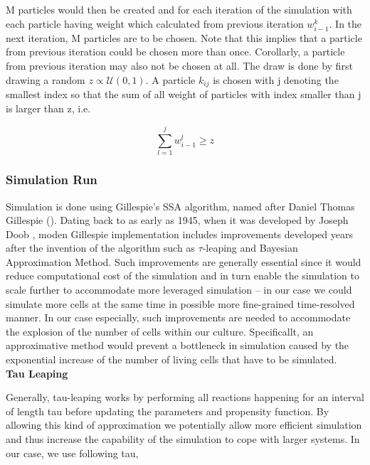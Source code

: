 \documentclass{bioinfo}
\begin{document}
M particles would then be created and for each iteration of the simulation with each particle having weight which calculated from previous iteration $w_{i - 1}^k$. In the next iteration, M particles are to be chosen. Note that this implies that a particle from previous iteration could be chosen more than once. Corollarly, a particle from previous iteration may also not be chosen at all. The draw is done by first drawing a random $z \propto \mathcal{U}(0, 1)$. A particle $k_{ij}$ is chosen with j denoting the smallest index so that the sum of all weight of particles with index smaller than j is larger than z, i.e.

\begin{equation}
\sum_{l=1}^{j} w_{i - 1}^l \geq z\label{eq:14}
\end{equation}

\subsubsection{Simulation Run}

Simulation is done using Gillespie's SSA algorithm, named after Daniel Thomas Gillespie (\citealp{Gillespie77}). Dating back to as early as 1945, when it was developed by Joseph Doob \citealp{Doob45} \citealp{Chung67}, moden Gillespie implementation includes improvements developed years after the invention of the algorithm such as $\tau$-leaping and Bayesian Approximation Method. Such improvements are generally essential since it would reduce computational cost of the simulation and in turn enable the simulation to scale further to accommodate more leveraged simulation -- in our case we could simulate more cells at the same time in possible more fine-grained time-resolved manner. In our case especially, such improvements are needed to accommodate the explosion of the number of cells within our culture. Specificallt, an approximative method would prevent a bottleneck in simulation caused by the exponential increase of the number of living cells that have to be simulated.\\

\textbf{Tau Leaping}

Generally, tau-leaping works by performing all reactions happening for an interval of length tau before updating the parameters and propensity function. By allowing this kind of approximation we potentially allow more efficient simulation and thus increase the capability of the simulation to cope with larger systems. In our case, we use following tau,
\end{document}
